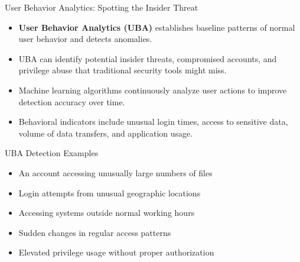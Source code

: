 \documentclass{beamer}
\begin{document}
\begin{frame}{User Behavior Analytics: Spotting the Insider Threat}
\begin{itemize}
\item \textbf{User Behavior Analytics (UBA)} establishes baseline patterns of normal user behavior and detects anomalies.
\item UBA can identify potential insider threats, compromised accounts, and privilege abuse that traditional security tools might miss.
\item Machine learning algorithms continuously analyze user actions to improve detection accuracy over time.
\item Behavioral indicators include unusual login times, access to sensitive data, volume of data transfers, and application usage.
\end{itemize}

\begin{block}{UBA Detection Examples}
\begin{itemize}
\item An account accessing unusually large numbers of files
\item Login attempts from unusual geographic locations
\item Accessing systems outside normal working hours
\item Sudden changes in regular access patterns
\item Elevated privilege usage without proper authorization
\end{itemize}
\end{block}
\end{frame}
\end{document}
